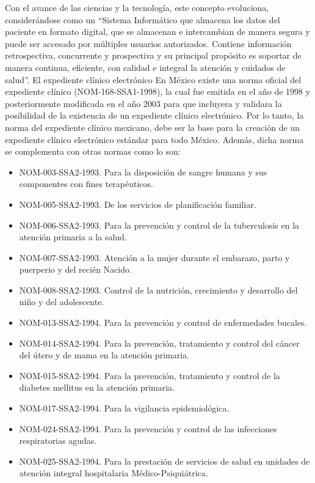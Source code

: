 Con el avance de las ciencias y la tecnología, este concepto evoluciona, considerándose como un “Sistema Informático que almacena los datos del paciente en formato digital, que se almacenan e intercambian de manera segura y puede ser accesado por múltiples usuarios autorizados. Contiene información retrospectiva, concurrente y prospectiva y su principal propósito es soportar de manera continua, eficiente, con calidad e integral la atención y cuidados de salud”. \cite{marco1}
El expediente clínico electrónico
En México existe una norma oficial del expediente clínico (NOM-168-SSA1-1998), la cual fue emitida en el año de 1998 y posteriormente modificada en el año 2003 para que incluyera y validara la posibilidad de la existencia de un expediente clínico electrónico. Por lo tanto, la norma del expediente clínico mexicano, debe ser la base para la creación de un expediente clínico electrónico estándar para todo México. Además, dicha norma se complementa con otras normas como lo son:
\begin{itemize}
  \item NOM-003-SSA2-1993. Para la disposición de sangre humana y sus componentes con fines terapéuticos.
  \item NOM-005-SSA2-1993. De los servicios de planificación familiar.
  \item NOM-006-SSA2-1993. Para la prevención y control de la tuberculosis en la atención primaria a la salud.
  \item NOM-007-SSA2-1993. Atención a la mujer durante el embarazo, parto y puerperio y del recién Nacido.
  \item NOM-008-SSA2-1993. Control de la nutrición, crecimiento y desarrollo del niño y del adolescente.
  \item NOM-013-SSA2-1994. Para la prevención y control de enfermedades bucales.
  \item NOM-014-SSA2-1994. Para la prevención, tratamiento y control del cáncer del útero y de mama en la atención primaria.
  \item NOM-015-SSA2-1994. Para la prevención, tratamiento y control de la diabetes mellitus en la atención primaria.
  \item NOM-017-SSA2-1994. Para la vigilancia epidemiológica.
  \item NOM-024-SSA2-1994. Para la prevención y control de las infecciones respiratorias agudas.
  \item NOM-025-SSA2-1994. Para la prestación de servicios de salud en unidades de atención integral hospitalaria Médico-Psiquiátrica. \cite{marco2}

\end{itemize}


